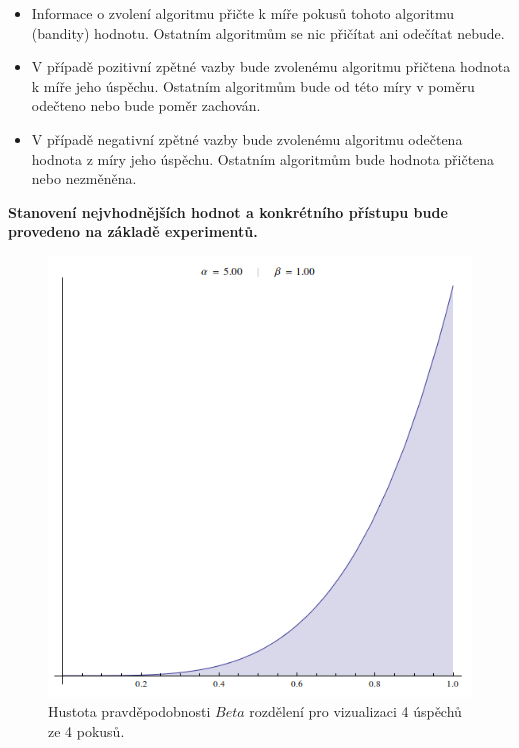\documentclass[thesis=M,czech]{FITthesis}[2014/05/07]
\begin{document}
\begin{itemize}
	\item Informace o zvolení algoritmu přičte k míře pokusů tohoto algoritmu (bandity) hodnotu. Ostatním algoritmům se nic přičítat ani odečítat nebude.
	\item V případě pozitivní zpětné vazby bude zvolenému algoritmu přičtena hodnota k míře jeho úspěchu. Ostatním algoritmům bude od této míry v poměru odečteno nebo bude poměr zachován.
	\item V případě negativní zpětné vazby bude zvolenému algoritmu odečtena hodnota z míry jeho úspěchu. Ostatním algoritmům bude hodnota přičtena nebo nezměněna.
\end{itemize}

\textbf{Stanovení nejvhodnějších hodnot a konkrétního přístupu bude provedeno na základě experimentů.}

\begin{figure}\centering
	\includegraphics[width=1.0\textwidth]{obr/beta1.png}
 	\caption[Hustota pravděpodobnosti $Beta$ rozdělení pro vizualizaci 4 úspěchů ze 4 pokusů.]{Hustota pravděpodobnosti $Beta$ rozdělení pro vizualizaci 4 úspěchů ze 4 pokusů.}\label{fig:beta1}
\end{figure}	
\end{document}
